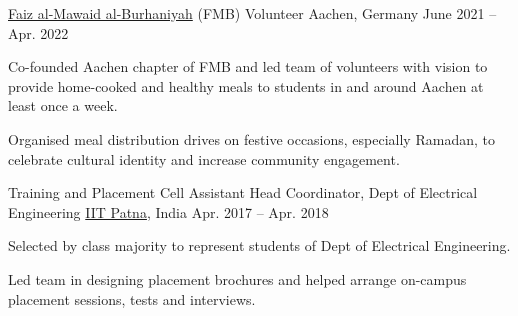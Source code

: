 
\begin{cvpositions}

\cvrole
	{\href{https://www.thedawoodibohras.com/about-the-bohras/faiz-al-mawaid-al-burhaniyah/}{Faiz al-Mawaid al-Burhaniyah} (FMB)} %
	{Volunteer} %
	{Aachen, Germany} %
	{June 2021 -- Apr. 2022} %
	{\begin{cvitems} %
		\item {Co-founded Aachen chapter of FMB and led team of volunteers with vision to provide home-cooked and healthy meals to students in and around Aachen at least once a week.}
		\item {Organised meal distribution drives on festive occasions, especially Ramadan, to celebrate cultural identity and increase community engagement.}
	\end{cvitems}}

\cvrole
	{Training and Placement Cell} %
	{Assistant Head Coordinator, Dept of Electrical Engineering} %
	{\href{https://www.iitp.ac.in}{IIT Patna}, India} %
	{Apr. 2017 -- Apr. 2018} %
	{\begin{cvitems} %
		\item {Selected by class majority to represent students of Dept of Electrical Engineering.}
		\item {Led team in designing placement brochures and helped arrange on-campus placement sessions, tests and interviews.}
	\end{cvitems}}


\end{cvpositions}
